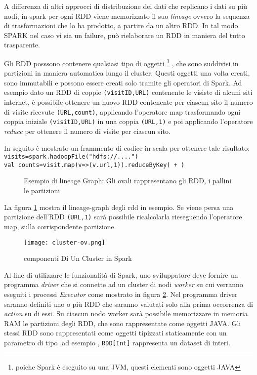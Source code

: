   
  
A differenza di altri approcci di distribuzione dei dati che replicano i dati su più nodi, in spark per ogni RDD viene memorizzato il suo \emph{lineage} ovvero la sequenza di trasformazioni che lo ha prodotto, a partire da un altro RDD. In tal modo SPARK nel caso vi sia un failure, può rielaborare un RDD in maniera del tutto trasparente.
 
Gli RDD posssono contenere qualsiasi tipo di oggetti \footnote{poiche Spark è eseguito su una JVM, questi elementi sono oggetti JAVA} , che sono suddivisi in
partizioni in maniera automatica lungo il cluster. Questi oggetti una volta
creati, sono immutabili e possono essere creati solo tramite gli operatori
di Spark.
Ad esempio dato un RDD di coppie \texttt{(visitID,URL)} contenente le visiste di
alcuni siti internet, è possibile ottenere un nuovo RDD contenente per ciascun
sito il numero di visite ricevute \texttt{(URL,count)}, applicando l’operatore map
trasformando ogni coppia iniziale \texttt{(visitID,URL)} in una coppia \texttt{(URL,1)} e
poi applicando l'operatore \emph{reduce} per ottenere il numero di visite per ciascun sito.

In seguito è mostrato un frammento di codice in scala per ottenere tale
risultato:\\
\texttt{visits=spark.hadoopFile("hdfs://....")}\\
\texttt{val counts=visit.map(v=>(v.url,1)).reduceByKey( + )}\\


\begin{figure}[htbp]
    \caption{Esempio di lineage Graph: Gli ovali rappresentano gli RDD, i pallini le partizioni}
    \label{fig:lineageRDD}
\end{figure}

La figura \ref{fig:lineageRDD} mostra il lineage-graph degli rdd in esempio. Se
viene persa una partizione dell'RDD \texttt{(URL,1)} sarà possibile ricalcolarla
rieseguendo l'operatore map, sulla corrispondente partizione.

\begin{figure}[h]
\centering
\texttt{[image: cluster-ov.png]}
\caption{componenti Di Un Cluster in Spark}
\label{fig:sparkClusterComponents}
\end{figure} 

 Al fine di utilizzare le funzionalità di Spark, uno sviluppatore deve fornire un programma \emph{driver} che si connette ad un cluster di nodi \emph{worker} su cui verranno eseguiti i processi \emph{Executor}  come mostrato in figura \ref{fig:sparkClusterComponents}.
 Nel programma driver saranno definiti uno o più RDD che saranno valutati solo alla prima occorrenza di \emph{action} su di essi. Su ciascun nodo worker sarà possibile memorizzare in memoria RAM le partizioni degli RDD, che sono rappresentate come oggetti JAVA.
Gli   stessi RDD sono rappresentati come  oggetti tipizzati staticamente con un parametro di tipo ,ad esempio ,
\texttt{RDD[Int]} rappresenta un dataset di interi.  


